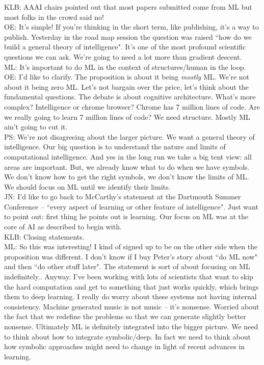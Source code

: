 KLB: AAAI chairs pointed out that most papers submitted come from ML but most folks in the crowd said no! \\

OE: It's simple! If you're thinking in the short term, like publishing, it's a way to publish. Yesterday in the road map session the question was raised ``how do we build a general theory of intelligence". It's one of the most profound scientific questions we can ask. We're going to need a lot more than gradient descent. \\

ML: It's important to do ML in the context of structures/human in the loop. \\

OE: I'd like to clarify. The proposition is about it being {\it mostly} ML. We're not about it being zero ML. Let's not bargain over the price, let's think about the fundamental questions. The debate is about cognitive architecture. What's more complex? Intelligence or chrome browser? Chrome has 7 million lines of code. Are we really going to learn 7 million lines of code? We need structure. Mostly ML ain't going to cut it. \\

PS: We're not disagreeing about the larger picture. We want a general theory of intelligence. Our big question is to understand the nature and limits of computational intelligence. And yes in the long run we take a big tent view: all areas are important. But, we already know what to do when we have symbols. We don't know how to get the right symbols, we don't know the limits of ML. We should focus on ML until we identify their limits.\\

JN: I'd like to go back to McCarthy's statement at the Dartmouth Summer Conference -- ``every aspect of learning or other feature of intelligence". Just want to point out: first thing he points out is learning. Our focus on ML was at the core of AI as described to begin with. \\

KLB: Closing statements. \\

ML: So this was interesting! I kind of signed up to be on the other side when the proposition was different. I don't know if I buy Peter's story about ``do ML now" and then ``do other stuff later". The statement is sort of about focusing on ML indefinitely.. Anyway. I've been working with lots of scientists that want to skip the hard computation and get to something that just works quickly, which brings them to deep learning. I really do worry about these systems not having internal consistency. Machine generated music is not music -- it's nonsense. Worried about the fact that we redefine the problems so that we can generate slightly better nonsense. Ultimately ML is definitely integrated into the bigger picture. We need to think about how to integrate symbolic/deep. In fact we need to think about how symbolic approaches might need to change in light of recent advances in learning. \\

